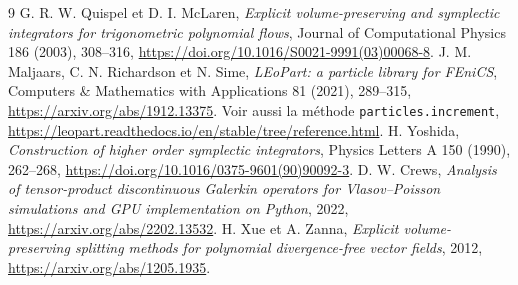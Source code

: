 \documentclass[11pt,a4paper]{article}
\begin{document}
\begin{thebibliography}{9}
 G. R. W. Quispel et D. I. McLaren,
\emph{Explicit volume-preserving and symplectic integrators for
trigonometric polynomial flows}, Journal of Computational Physics 186
(2003), 308--316,
\url{https://doi.org/10.1016/S0021-9991(03)00068-8}.
 J. M. Maljaars, C. N. Richardson et N. Sime,
\emph{LEoPart: a particle library for FEniCS},
Computers \& Mathematics with Applications 81 (2021), 289--315,
\url{https://arxiv.org/abs/1912.13375}. Voir aussi la méthode
\texttt{particles.increment},
\url{https://leopart.readthedocs.io/en/stable/tree/reference.html}.
 H. Yoshida, \emph{Construction of higher order symplectic
integrators}, Physics Letters A 150 (1990), 262--268,
\url{https://doi.org/10.1016/0375-9601(90)90092-3}.
 D. W. Crews, \emph{Analysis of tensor-product discontinuous
Galerkin operators for Vlasov--Poisson simulations and GPU implementation
on Python}, 2022, \url{https://arxiv.org/abs/2202.13532}.
 H. Xue et A. Zanna, \emph{Explicit volume-preserving splitting
methods for polynomial divergence-free vector fields}, 2012,
\url{https://arxiv.org/abs/1205.1935}.
\end{thebibliography}
\end{document}
